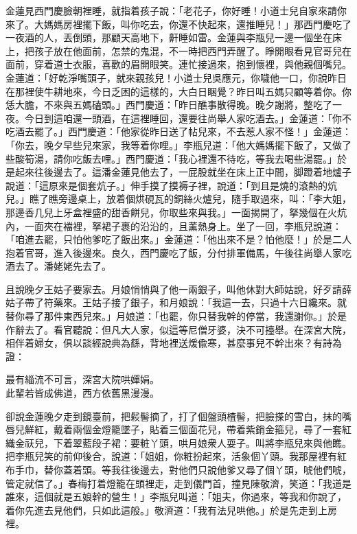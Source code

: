 金蓮見西門慶臉朝裡睡，就指着孩子說：「老花子，你好睡！小道士兒自家來請你來了。大媽媽房裡擺下飯，叫你吃去，你還不快起來，還推睡兒！」那西門慶吃了一夜酒的人，丟倒頭，那顧天高地下，鼾睡如雷。金蓮與李瓶兒一邊一個坐在床上，把孩子放在他面前，怎禁的鬼混，不一時把西門弄醒了。睜開眼看見官哥兒在面前，穿着道士衣服，喜歡的眉開眼笑。連忙接過來，抱到懷裡，與他親個嘴兒。金蓮道：「好乾淨嘴頭子，就來親孩兒！小道士兒吳應元，你噦他一口，你說昨日在那裡使牛耕地來，今日乏困的這樣的，大白日睏覺？昨日叫五媽只顧等着你。你恁大膽，不來與五媽磕頭。」{}西門慶道：「昨日醮事散得晚。晚夕謝將，整吃了一夜。今日到這咱還一頭酒，在這裡睡回，還要往尚舉人家吃酒去。」金蓮道：「你不吃酒去罷了。」西門慶道：「他家從昨日送了帖兒來，不去惹人家不怪！」金蓮道：「你去，晚夕早些兒來家，我等着你哩。」李瓶兒道：「他大媽媽擺下飯了，又做了些酸筍湯，請你吃飯去哩。」西門慶道：「我心裡還不待吃，等我去喝些湯罷。」於是起來往後邊去了。這潘金蓮見他去了，一屁股就坐在床上正中間，脚蹬着地爐子說道：「這原來是個套炕子。」伸手摸了摸褥子裡，說道：「到且是燒的滾熱的炕兒。」瞧了瞧旁邊桌上，放着個烘硯瓦的銅絲火爐兒，隨手取過來，叫：「李大姐，那邊香几兒上牙盒裡盛的甜香餅兒，你取些來與我。」一面揭開了，拏幾個在火炕內，一面夾在襠裡，拏裙子裹的沿沿的，且薰熱身上。坐了一回，李瓶兒說道：「咱進去罷，只怕他爹吃了飯出來。」金蓮道：「他出來不是？怕他麼！」於是二人抱着官哥，進入後邊來。良久，西門慶吃了飯，分付排軍備馬，午後往尚舉人家吃酒去了。潘姥姥先去了。

且說晚夕王姑子要家去。月娘悄悄與了他一兩銀子，叫他休對大師姑說，好歹請薛姑子帶了符藥來。王姑子接了銀子，和月娘說：「我這一去，只過十六日纔來。就替你尋了那件東西兒來。」月娘道：「也罷，你只替我幹的停當，我還謝你。」於是作辭去了。看官聽說：但凡大人家，似這等尼僧牙婆，決不可擡舉。在深宮大院，相伴着婦女，俱以談經說典為繇，背地裡送煖偸寒，甚麼事兒不幹出來？有詩為證：

\begin{myquote}
最有緇流不可言，深宮大院哄嬋娟。\\此輩若皆成佛道，西方依舊黑漫漫。
\end{myquote}

卻說金蓮晚夕走到鏡臺前，把鬏髻摘了，打了個盤頭楂髻，把臉搽的雪白，抹的嘴唇兒鮮紅，戴着兩個金燈籠墜子，貼着三個面花兒，帶着紫銷金箍兒，尋了一套紅織金祆兒，下着翠藍段子裙：要粧丫頭，哄月娘衆人耍子。叫將李瓶兒來與他瞧。把李瓶兒笑的前仰後合，說道：「姐姐，你粧扮起來，活象個丫頭。我那屋裡有紅布手巾，替你蓋着頭。等我往後邊去，對他們只說他爹又尋了個丫頭，唬他們唬，{}管定就信了。」春梅打着燈籠在頭裡走，走到儀門首，撞見陳敬濟，笑道：「我道是誰來，這個就是五娘幹的營生！」李瓶兒叫道：「姐夫，你過來，等我和你說了，着你先進去見他們，只如此這般。」敬濟道：「我有法兒哄他。」於是先走到上房裡。

